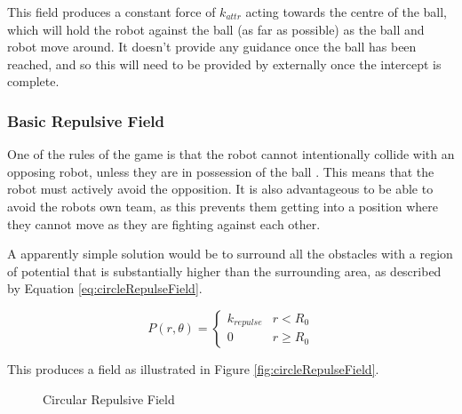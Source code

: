 \documentclass[10pt]{article}
\begin{document}
This field produces a constant force of $k_{attr}$ acting towards the centre of
the ball, which will hold the robot against the ball (as far as possible) as the
ball and robot move around. It doesn't provide any guidance once the ball has
been reached, and so this will need to be provided by externally once
the intercept is complete.

\subsubsection{Basic Repulsive Field\label{sub:Basic-Repulsive-Field}}

One of the rules of the game is that the robot cannot intentionally collide with
an opposing robot, unless they are in possession of the ball
\cite{simurosotSim}. This means that the robot must actively avoid the
opposition. It is also advantageous to be able to avoid the robots own team, as
this prevents them getting into a position where they cannot move as they are
fighting against each other.

A apparently simple solution would be to surround all the obstacles with a
region of potential that is substantially higher than the surrounding area, as
described by Equation \ref{eq:circleRepulseField}.

\begin{equation}
P\left(r,\theta\right)=\begin{cases}
k_{repulse} & r<R_{0}\\
0 & r\geq R_{0}
\end{cases}\label{eq:circleRepulseField}
\end{equation}

This produces a field as illustrated in Figure \ref{fig:circleRepulseField}.

\begin{figure}
 \centering
 \caption{Circular Repulsive Field}
\end{figure}
\end{document}

